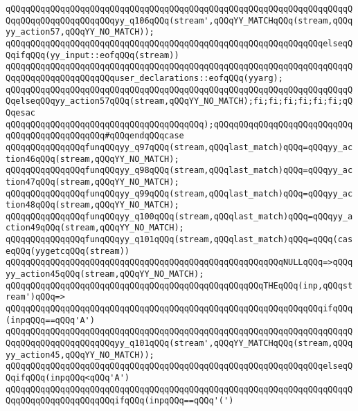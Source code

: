 \verb|qQQqqQQqqQQqqQQqqQQqqQQqqQQqqQQqqQQqqQQqqQQqqQQqqQQqqQQqqQQqqQQqqQQqqQQqqQQqqQQqqQQqqQQqqQQqyy_q106qQQq(stream',qQQqYY_MATCHqQQq(stream,qQQqyy_action57,qQQqYY_NO_MATCH));|\newline
\verb|qQQqqQQqqQQqqQQqqQQqqQQqqQQqqQQqqQQqqQQqqQQqqQQqqQQqqQQqqQQqqQQqelseqQQqifqQQq(yy_input::eofqQQq(stream))|\newline
\verb|qQQqqQQqqQQqqQQqqQQqqQQqqQQqqQQqqQQqqQQqqQQqqQQqqQQqqQQqqQQqqQQqqQQqqQQqqQQqqQQqqQQqqQQqqQQquser_declarations::eofqQQq(yyarg);|\newline
\verb|qQQqqQQqqQQqqQQqqQQqqQQqqQQqqQQqqQQqqQQqqQQqqQQqqQQqqQQqqQQqqQQqqQQqqQQqelseqQQqyy_action57qQQq(stream,qQQqYY_NO_MATCH);fi;fi;fi;fi;fi;fi;qQQqesac|\newline
\verb|qQQqqQQqqQQqqQQqqQQqqQQqqQQqqQQqqQQqqQQq);qQQqqQQqqQQqqQQqqQQqqQQqqQQqqQQqqQQqqQQqqQQqqQQq#qQQqendqQQqcase|\newline
\verb|qQQqqQQqqQQqqQQqfunqQQqyy_q97qQQq(stream,qQQqlast_match)qQQq=qQQqyy_action46qQQq(stream,qQQqYY_NO_MATCH);|\newline
\verb|qQQqqQQqqQQqqQQqfunqQQqyy_q98qQQq(stream,qQQqlast_match)qQQq=qQQqyy_action47qQQq(stream,qQQqYY_NO_MATCH);|\newline
\verb|qQQqqQQqqQQqqQQqfunqQQqyy_q99qQQq(stream,qQQqlast_match)qQQq=qQQqyy_action48qQQq(stream,qQQqYY_NO_MATCH);|\newline
\verb|qQQqqQQqqQQqqQQqfunqQQqyy_q100qQQq(stream,qQQqlast_match)qQQq=qQQqyy_action49qQQq(stream,qQQqYY_NO_MATCH);|\newline
\verb|qQQqqQQqqQQqqQQqfunqQQqyy_q101qQQq(stream,qQQqlast_match)qQQq=qQQq(caseqQQq(yygetcqQQq(stream))|\newline
\verb|qQQqqQQqqQQqqQQqqQQqqQQqqQQqqQQqqQQqqQQqqQQqqQQqqQQqqQQqNULLqQQq=>qQQqyy_action45qQQq(stream,qQQqYY_NO_MATCH);|\newline
\verb|qQQqqQQqqQQqqQQqqQQqqQQqqQQqqQQqqQQqqQQqqQQqqQQqqQQqTHEqQQq(inp,qQQqstream')qQQq=>|\newline
\verb|qQQqqQQqqQQqqQQqqQQqqQQqqQQqqQQqqQQqqQQqqQQqqQQqqQQqqQQqqQQqqQQqifqQQq(inpqQQq==qQQq'A')|\newline
\verb|qQQqqQQqqQQqqQQqqQQqqQQqqQQqqQQqqQQqqQQqqQQqqQQqqQQqqQQqqQQqqQQqqQQqqQQqqQQqqQQqqQQqqQQqqQQqyy_q101qQQq(stream',qQQqYY_MATCHqQQq(stream,qQQqyy_action45,qQQqYY_NO_MATCH));|\newline
\verb|qQQqqQQqqQQqqQQqqQQqqQQqqQQqqQQqqQQqqQQqqQQqqQQqqQQqqQQqqQQqqQQqelseqQQqifqQQq(inpqQQq<qQQq'A')|\newline
\verb|qQQqqQQqqQQqqQQqqQQqqQQqqQQqqQQqqQQqqQQqqQQqqQQqqQQqqQQqqQQqqQQqqQQqqQQqqQQqqQQqqQQqqQQqqQQqifqQQq(inpqQQq==qQQq'(')|\newline
